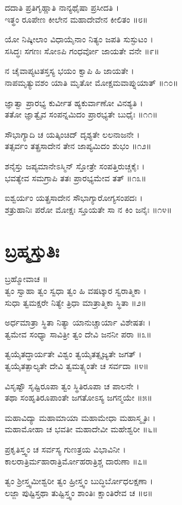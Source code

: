 ದದಾತಿ ಪ್ರತಿಗೃಹ್ಣಾತಿ ನಾನ್ಯಥೈಷಾ ಪ್ರಸೀದತಿ ।\\
ಇತ್ಥಂ ರೂಪೇಣ ಕೀಲೇನ ಮಹಾದೇವೇನ ಕೀಲಿತಂ ॥೮॥

ಯೋ ನಿಷ್ಕೀಲಾಂ ವಿಧಾಯೈನಾಂ ನಿತ್ಯಂ ಜಪತಿ ಸುಸ್ಫುಟಂ ।\\
ಸಸಿದ್ಧಃ ಸಗಣಃ ಸೋಽಪಿ ಗಂಧರ್ವೋ ಜಾಯತೇ ವನೇ ॥೯॥

ನ ಚೈವಾಪ್ಯಟತಸ್ತಸ್ಯ ಭಯಂ ಕ್ವಾಪಿ ಹಿ ಜಾಯತೇ ।\\
ನಾಪಮೃತ್ಯುವಶಂ ಯಾತಿ ಮೃತೋ ಮೋಕ್ಷಮವಾಪ್ನುಯಾತ್ ॥೧೦॥

ಜ್ಞಾತ್ವಾ ಪ್ರಾರಭ್ಯ ಕುರ್ವೀತ ಹ್ಯಕುರ್ವಾಣೋ ವಿನಶ್ಯತಿ ।\\
ತತೋ ಜ್ಞಾತ್ವೈವ ಸಂಪನ್ನಮಿದಂ ಪ್ರಾರಭ್ಯತೇ ಬುಧೈಃ ॥೧೧॥

ಸೌಭಾಗ್ಯಾದಿ ಚ ಯತ್ಕಿಂಚಿದ್ ದೃಶ್ಯತೇ ಲಲನಾಜನೇ ।\\
ತತ್ಸರ್ವಂ ತತ್ಪ್ರಸಾದೇನ ತೇನ ಜಾಪ್ಯಮಿದಂ ಶುಭಂ ॥೧೨॥

ಶನೈಸ್ತು ಜಪ್ಯಮಾನೇಽಸ್ಮಿನ್ ಸ್ತೋತ್ರೇ ಸಂಪತ್ತಿರುಚ್ಚಕೈಃ ।\\
ಭವತ್ಯೇವ ಸಮಗ್ರಾಪಿ ತತಃ ಪ್ರಾರಭ್ಯಮೇವ ತತ್ ॥೧೩॥

ಐಶ್ವರ್ಯಂ ಯತ್ಪ್ರಸಾದೇನ ಸೌಭಾಗ್ಯಾರೋಗ್ಯಸಂಪದಃ ।\\
ಶತ್ರುಹಾನಿಃ ಪರೋ ಮೋಕ್ಷಃ ಸ್ತೂಯತೇ ಸಾ ನ ಕಿಂ ಜನೈಃ ॥೧೪॥
\section{ಬ್ರಹ್ಮಸ್ತುತಿಃ}
ಬ್ರಹ್ಮೋವಾಚ ॥\\
ತ್ವಂ ಸ್ವಾಹಾ ತ್ವಂ ಸ್ವಧಾ ತ್ವಂ ಹಿ ವಷಟ್ಕಾರ ಸ್ವರಾತ್ಮಿಕಾ ।\\
ಸುಧಾ ತ್ವಮಕ್ಷರೇ ನಿತ್ಯೇ ತ್ರಿಧಾ ಮಾತ್ರಾತ್ಮಿಕಾ ಸ್ಥಿತಾ ॥೨॥

ಅರ್ಧಮಾತ್ರಾ ಸ್ಥಿತಾ ನಿತ್ಯಾ ಯಾನುಚ್ಚಾರ್ಯಾ ವಿಶೇಷತಃ ।\\
ತ್ವಮೇವ ಸಂಧ್ಯಾ ಸಾವಿತ್ರೀ ತ್ವಂ ದೇವಿ ಜನನೀ ಪರಾ ॥೩॥

ತ್ವಯೈತದ್ಧಾರ್ಯತೇ ವಿಶ್ವಂ ತ್ವಯೈತತ್ಸೃಜ್ಯತೇ ಜಗತ್ ।\\
ತ್ವಯೈತತ್ಪಾಲ್ಯತೇ ದೇವಿ ತ್ವಮತ್ಸ್ಯಂತೇ ಚ ಸರ್ವದಾ ॥೪॥

ವಿಸೃಷ್ಟೌ ಸೃಷ್ಟಿರೂಪಾ ತ್ವಂ ಸ್ಥಿತಿರೂಪಾ ಚ ಪಾಲನೇ ।\\
ತಥಾ ಸಂಹೃತಿರೂಪಾಂತೇ ಜಗತೋಽಸ್ಯ ಜಗನ್ಮಯೇ ॥೫॥

ಮಹಾವಿದ್ಯಾ ಮಹಾಮಾಯಾ ಮಹಾಮೇಧಾ ಮಹಾಸ್ಮೃತಿಃ ।\\
ಮಹಾಮೋಹಾ ಚ ಭವತೀ ಮಹಾದೇವೀ ಮಹೇಶ್ವರೀ ॥೬॥

ಪ್ರಕೃತಿಸ್ತ್ವಂ ಚ ಸರ್ವಸ್ಯ ಗುಣತ್ರಯ ವಿಭಾವಿನೀ ।\\
ಕಾಲರಾತ್ರಿರ್ಮಹಾರಾತ್ರಿರ್ಮೋಹರಾತ್ರಿಶ್ಚ ದಾರುಣಾ ॥೭॥

ತ್ವಂ ಶ್ರೀಸ್ತ್ವಮೀಶ್ವರೀ ತ್ವಂ ಹ್ರೀಸ್ತ್ವಂ ಬುದ್ಧಿರ್ಬೋಧಲಕ್ಷಣಾ ।\\
ಲಜ್ಜಾ ಪುಷ್ಟಿಸ್ತಥಾ ತುಷ್ಟಿಸ್ತ್ವಂ ಶಾಂತಿಃ ಕ್ಷಾಂತಿರೇವ ಚ ॥೮॥

